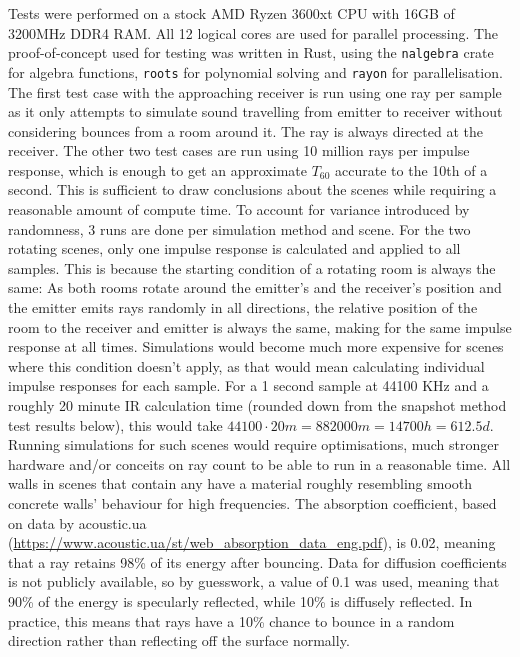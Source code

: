 Tests were performed on a stock AMD Ryzen 3600xt CPU with 16GB of 3200MHz DDR4 RAM.
All 12 logical cores are used for parallel processing.
\newline
The proof-of-concept used for testing was written in Rust, using the \verb|nalgebra| crate for algebra functions,
\verb|roots| for polynomial solving and \verb|rayon| for parallelisation.
\newline
The first test case with the approaching receiver is run using one ray per sample
as it only attempts to simulate sound travelling from emitter to receiver
without considering bounces from a room around it.
The ray is always directed at the receiver.
\newline
The other two test cases are run using 10 million rays per impulse response,
which is enough to get an approximate \(T_{60}\) accurate to the 10th of a second.
This is sufficient to draw conclusions about the scenes while requiring a reasonable amount of compute time.
To account for variance introduced by randomness, 3 runs are done per simulation method and scene.
\newline
For the two rotating scenes, only one impulse response is calculated and applied to all samples.
This is because the starting condition of a rotating room is always the same:
As both rooms rotate around the emitter's and the receiver's position
and the emitter emits rays randomly in all directions,
the relative position of the room to the receiver and emitter is always the same,
making for the same impulse response at all times.
\newline
Simulations would become much more expensive for scenes where this condition doesn't apply,
as that would mean calculating individual impulse responses for each sample.
For a 1 second sample at 44100 KHz and a roughly 20 minute IR calculation time
(rounded down from the snapshot method test results below),
this would take \(44100 \cdot 20 m = 882000 m = 14700 h = 612.5 d\).
Running simulations for such scenes would require optimisations, much stronger hardware
and/or conceits on ray count to be able to run in a reasonable time.
\newline
All walls in scenes that contain any have a material roughly resembling smooth concrete walls' behaviour for high frequencies.
The absorption coefficient, based on data by acoustic.ua (\url{https://www.acoustic.ua/st/web_absorption_data_eng.pdf}),
is 0.02, meaning that a ray retains 98\% of its energy after bouncing.
Data for diffusion coefficients is not publicly available, so by guesswork, a value of 0.1 was used,
meaning that 90\% of the energy is specularly reflected, while 10\% is diffusely reflected.
In practice, this means that rays have a 10\% chance to bounce in a random direction rather than reflecting off the surface normally.

